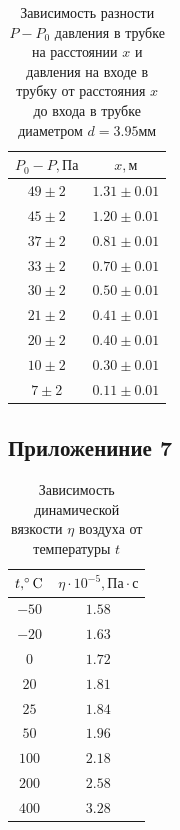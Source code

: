 \begin{table}[ht]
\begin{tabular}{|c|c|}
 \hline
$P_0-P, \text{Па}$ & $x, \text{м}$ \\
 \hline
$49 \pm 2$ & $1.31\pm 0.01$  \\  \hline
$45\pm 2$ & $1.20 \pm 0.01$ \\ \hline
$37\pm 2$ & $0.81\pm 0.01$  \\ \hline
$33\pm 2$ & $0.70\pm 0.01$  \\ \hline
$30\pm 2$ & $0.50\pm 0.01$  \\ \hline
$21\pm 2$ & $0.41\pm 0.01$  \\ \hline
$20\pm 2$ & $0.40\pm 0.01$  \\ \hline
$10\pm 2$ & $0.30\pm 0.01$  \\ \hline
$7\pm 2$ & $0.11\pm 0.01$  \\ \hline
\end{tabular}
\caption{Зависимость разности $P-P_0$ давления в трубке на расстоянии $x$ и давления на входе в трубку от расстояния $x$ до входа в трубке диаметром $d = 3.95\text{мм}$}
\end{table}

\subsection{Приложениние 7} \label{Приложение 7}

\begin{table}[ht]
\begin{tabular}{|c|c|}
 \hline
$t, \celsius$ & $\eta\cdot 10^{-5}, \text{Па}\cdot\text{с}$ \\
 \hline
$-50$ & $1.58$  \\  \hline
$-20$ & $1.63$ \\ \hline
$0$ & $1.72$  \\ \hline
$20$ & $1.81$  \\ \hline
$25$ & $1.84$  \\ \hline
$50$ & $1.96$  \\ \hline
$100$ & $2.18$  \\ \hline
$200$ & $2.58$  \\ \hline
$400$ & $3.28$  \\ \hline
\end{tabular}
\caption{Зависимость динамической вязкости $\eta$ воздуха от температуры $t$}
\end{table}